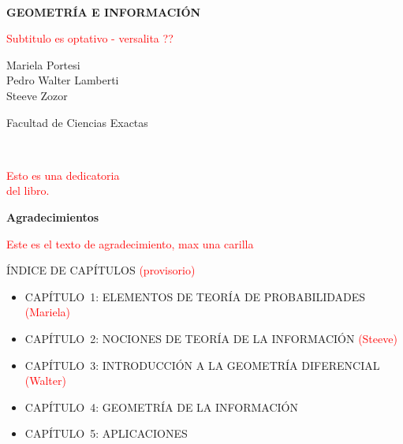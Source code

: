 \documentclass[10pt]{article}
\begin{document}
\mbox{ }\vspace{6cm}

\begin{center}
{\Huge
\textbf{GEOMETR\'IA E INFORMACI\'ON}
}

{\LARGE
\textcolor{red}{Subtitulo es optativo - versalita ??}
}

\vspace{4cm}

{\Large Mariela Portesi} \\
{\Large Pedro Walter Lamberti} \\
{\Large Steeve Zozor}

\vfill

{\large 
Facultad de Ciencias Exactas
}

\end{center}

\newpage

\mbox{ }\vspace{6cm}

\begin{flushright}
\textcolor{red}{Esto es una dedicatoria \\
del libro.}
\end{flushright}

\newpage

{\LARGE \textbf{Agradecimientos}}

\vspace{4cm}

\textcolor{red}{Este es el texto de agradecimiento, max una carilla}

\newpage






\'INDICE DE CAP\'ITULOS \textcolor{red}{(provisorio)} 

\begin{itemize}

\item{CAP\'ITULO~1: ELEMENTOS DE TEOR\'IA DE PROBABILIDADES \textcolor{red}{(Mariela)}} 

\item{CAP\'ITULO~2: NOCIONES DE TEOR\'IA DE LA INFORMACI\'ON \textcolor{red}{(Steeve)}}

\item{CAP\'ITULO~3: INTRODUCCI\'ON A LA GEOMETR\'IA DIFERENCIAL \textcolor{red}{(Walter)}}

\item{CAP\'ITULO~4: GEOMETR\'IA DE LA INFORMACI\'ON}

\item{CAP\'ITULO~5: APLICACIONES} 

\end{itemize}
\end{document}
